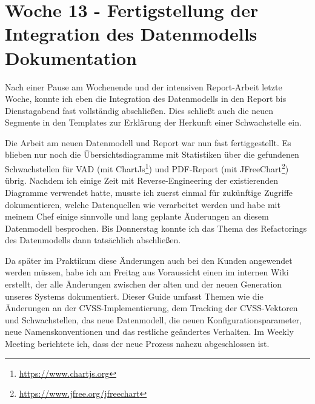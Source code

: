 \section{Woche 13 - Fertigstellung der Integration des Datenmodells \headerand Dokumentation} \label{sec:bericht-wo-13}


\lweekdaymarginpar{\weekdayMondayShort, \weekdayTuesdayShort}

Nach einer Pause am Wochenende und der intensiven Report-Arbeit letzte Woche, konnte ich eben die Integration des Datenmodells in den Report bis Dienstagabend fast vollständig abschließen.
Dies schließt auch die neuen Segmente in den Templates zur Erklärung der Herkunft einer Schwachstelle ein.

\sweekdaymarginpar{\weekdayWednesdayShort, \weekdayThursdayShort}

Die Arbeit am neuen Datenmodell und Report war nun fast fertiggestellt.
Es blieben nur noch die Übersichtsdiagramme mit Statistiken über die gefundenen Schwachstellen für VAD (mit ChartJs\footnote{\url{https://www.chartjs.org}}) und PDF-Report (mit JFreeChart\footnote{\url{https://www.jfree.org/jfreechart}}) übrig.
Nachdem ich einige Zeit mit Reverse-Engineering der existierenden Diagramme verwendet hatte, musste ich zuerst einmal für zukünftige Zugriffe dokumentieren, welche Datenquellen wie verarbeitet werden und habe mit meinem Chef einige sinnvolle und lang geplante Änderungen an diesem Datenmodell besprochen.
Bis Donnerstag konnte ich das Thema des Refactorings des Datenmodells dann tatsächlich abschließen.

\sweekdaymarginpar{\weekdayFridayLong}

Da später im Praktikum diese Änderungen auch bei den Kunden angewendet werden müssen, habe ich am Freitag aus Voraussicht einen  im internen Wiki erstellt, der alle Änderungen zwischen der alten und der neuen Generation unseres Systems dokumentiert.
Dieser Guide umfasst Themen wie die Änderungen an der CVSS-Implementierung, dem Tracking der CVSS-Vektoren und Schwachstellen, das neue Datenmodell, die neuen Konfigurationsparameter, neue Namenskonventionen und das restliche geändertes Verhalten.
Im Weekly Meeting berichtete ich, dass der neue Prozess nahezu abgeschlossen ist.
